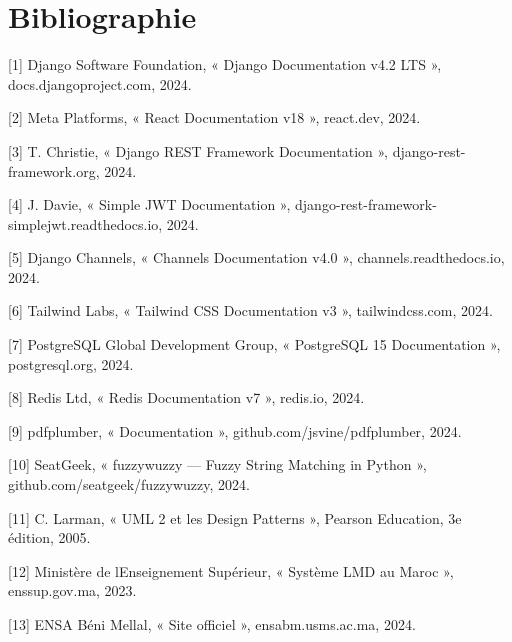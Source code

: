 \documentclass[
]{article}
\begin{document}
\hypertarget{bibliographie}{%
\section{Bibliographie}\label{bibliographie}}

{[}1{]} Django Software Foundation, « Django Documentation v4.2 LTS »,
docs.djangoproject.com, 2024.

{[}2{]} Meta Platforms, « React Documentation v18 », react.dev, 2024.

{[}3{]} T. Christie, « Django REST Framework Documentation »,
django-rest-framework.org, 2024.

{[}4{]} J. Davie, « Simple JWT Documentation »,
django-rest-framework-simplejwt.readthedocs.io, 2024.

{[}5{]} Django Channels, « Channels Documentation v4.0 »,
channels.readthedocs.io, 2024.

{[}6{]} Tailwind Labs, « Tailwind CSS Documentation v3 »,
tailwindcss.com, 2024.

{[}7{]} PostgreSQL Global Development Group, « PostgreSQL 15
Documentation », postgresql.org, 2024.

{[}8{]} Redis Ltd, « Redis Documentation v7 », redis.io, 2024.

{[}9{]} pdfplumber, « Documentation », github.com/jsvine/pdfplumber,
2024.

{[}10{]} SeatGeek, « fuzzywuzzy --- Fuzzy String Matching in Python »,
github.com/seatgeek/fuzzywuzzy, 2024.

{[}11{]} C. Larman, « UML 2 et les Design Patterns », Pearson Education,
3e édition, 2005.

{[}12{]} Ministère de l\textquotesingle Enseignement Supérieur, «
Système LMD au Maroc », enssup.gov.ma, 2023.

{[}13{]} ENSA Béni Mellal, « Site officiel », ensabm.usms.ac.ma, 2024.
\end{document}
